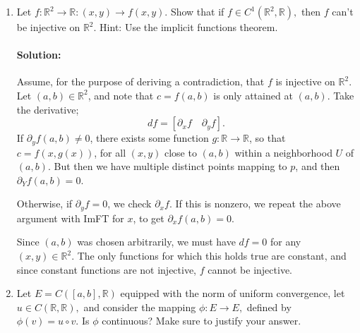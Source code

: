 \documentclass{article}
\begin{document}
\begin{enumerate}
\item   Let $f:\mathbb{R}^2\to\mathbb{R}:(x,y)\to f(x,y).$ Show that if $f\in C^1(\mathbb{R}^2,\mathbb{R}),$ then $f$ can't be injective on $\mathbb{R}^2.$ Hint: Use the implicit functions theorem.
    \paragraph{Solution: } Assume, for the purpose of deriving a contradiction, that $f$ is injective on $\mathbb{R}^2$. Let $(a,b)\in \mathbb{R}^2$, and note that $c=f(a,b)$ is only attained at $(a,b)$. Take the derivative; 
    \[
        df=[\partial_x f\quad \partial_y f]
    .\] 
    If $\partial_yf(a,b)\neq 0$, there exists some function $g:\mathbb{R}\to \mathbb{R}$, so that $c=f(x,g(x))$, for all $(x,y)$ close to $(a,b)$ within a neighborhood $U$ of $(a,b)$. But then we have multiple distinct points mapping to $p$, and then $\partial_Yf(a,b)=0$.

    Otherwise, if $\partial_yf=0$, we check $\partial_xf$. If this is nonzero, we repeat the above argument with ImFT for $x$, to get $\partial_xf(a,b)=0$.

    Since $(a,b)$ was chosen arbitrarily, we must have $df=0$ for any $(x,y)\in \mathbb{R}^2$. The only functions for which this holds true are constant, and since constant functions are not injective, $f$ cannot be injective.

    \newpage
\item  Let $E=C([a,b],\mathbb{R})$ equipped with the norm of uniform convergence, let $u\in C(\mathbb{R},\mathbb{R}),$ and consider the mapping $\phi:E\to E,$ defined by $\phi(v)=u\circ v.$ Is $\phi$ continuous? Make sure to justify your answer.

\end{enumerate}
\end{document}
